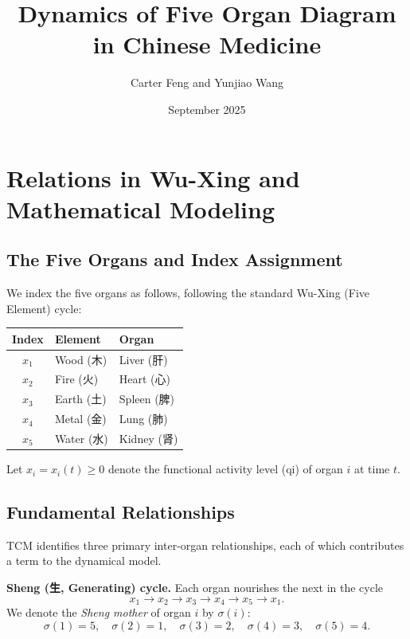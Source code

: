 \documentclass{article}
\title{Dynamics of Five Organ Diagram in Chinese Medicine}
\author{Carter Feng and Yunjiao Wang}
\date{September 2025}
\begin{document}
\maketitle

\section{Relations in Wu-Xing and Mathematical Modeling}

\subsection{The Five Organs and Index Assignment}

We index the five organs as follows, following the standard Wu-Xing (Five Element)
cycle:

\begin{center}
\begin{tabular}{cll}
\toprule
Index & Element & Organ \\
\midrule
$x_1$ & Wood\; (木) & Liver\; (肝) \\
$x_2$ & Fire\; (火)  & Heart\; (心) \\
$x_3$ & Earth\; (土) & Spleen\; (脾) \\
$x_4$ & Metal\; (金) & Lung\; (肺) \\
$x_5$ & Water\; (水) & Kidney\; (肾) \\
\bottomrule
\end{tabular}
\end{center}

\noindent
Let $x_i = x_i(t) \geq 0$ denote the functional activity level (qi) of organ $i$
at time $t$.

\subsection{Fundamental Relationships}

TCM identifies three primary inter-organ relationships, each of which contributes
a term to the dynamical model.

\medskip
\noindent\textbf{Sheng (生, Generating) cycle.}
Each organ nourishes the next in the cycle
\[
x_1 \to x_2 \to x_3 \to x_4 \to x_5 \to x_1.
\]
We denote the \emph{Sheng mother} of organ $i$ by $\sigma(i)$:
\[
\sigma(1)=5,\quad \sigma(2)=1,\quad \sigma(3)=2,\quad \sigma(4)=3,\quad \sigma(5)=4.
\]
\end{document}
